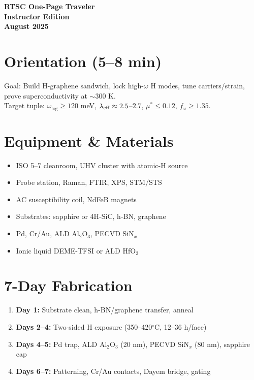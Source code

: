 \documentclass[12pt]{article}
\begin{document}
\begin{center}
{\Large \textbf{RTSC One-Page Traveler}}\\[6pt]
\textbf{Instructor Edition}\\
\textbf{August 2025}
\end{center}

\section*{Orientation (5--8 min)}
Goal: Build H-graphene sandwich, lock high-$\omega$ H modes, tune carriers/strain, prove superconductivity at $\sim$300 K.\\
Target tuple: $\omega_{\log}\ge120$ meV, $\lambda_{\rm eff}\approx2.5$--$2.7$, $\mu^*\le0.12$, $f_\omega\ge1.35$.

\section*{Equipment \& Materials}
\begin{itemize}
  \item ISO 5--7 cleanroom, UHV cluster with atomic-H source
  \item Probe station, Raman, FTIR, XPS, STM/STS
  \item AC susceptibility coil, NdFeB magnets
  \item Substrates: sapphire or 4H-SiC, h-BN, graphene
  \item Pd, Cr/Au, ALD Al$_2$O$_3$, PECVD SiN$_x$
  \item Ionic liquid DEME-TFSI or ALD HfO$_2$
\end{itemize}

\section*{7-Day Fabrication}
\begin{enumerate}
  \item \textbf{Day 1:} Substrate clean, h-BN/graphene transfer, anneal
  \item \textbf{Days 2--4:} Two-sided H exposure (350--420$^\circ$C, 12--36 h/face)
  \item \textbf{Days 4--5:} Pd trap, ALD Al$_2$O$_3$ (20 nm), PECVD SiN$_x$ (80 nm), sapphire cap
  \item \textbf{Days 6--7:} Patterning, Cr/Au contacts, Dayem bridge, gating
\end{enumerate}
\end{document}
